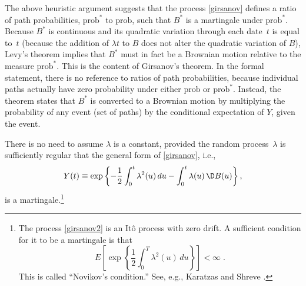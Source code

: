 The above heuristic argument suggests that the process \eqref{girsanov}
defines a ratio of path probabilities, $\text{prob}^*$ to $\text{prob}$, such that $B^*$ is a martingale
under $\text{prob}^*$.  
Because $B^*$ is continuous and its quadratic
variation through each date~$t$ is equal to~$t$ (because the addition
of $\lambda t$ to $B$ does not alter the quadratic variation of $B$),
Levy's theorem implies that $B^*$ 
must in fact be a Brownian motion relative to the measure $\text{prob}^*$.
This is the content of
Girsanov's theorem.  In the formal statement, there is no reference
to ratios of path probabilities, because individual paths actually
have zero probability under either $\text{prob}$ or $\text{prob}^*$.  Instead, the theorem states
that $B^*$ is converted to a Brownian motion by multiplying the probability
of any event (set of paths) by the conditional expectation of $Y$, given the event.

There is no need to assume $\lambda$ is a constant, provided 
the random process~$\lambda$ is 
sufficiently regular that the general form of \eqref{girsanov},
i.e.,
\begin{equation}\label{girsanov2}
Y(t) \equiv \exp \left\{ -\frac{ 1}{2}\int_0^t \lambda^2(u)\,du - \int _0^t
\lambda(u)\,\D B(u) \right\}, 
\end{equation} 
is a martingale.\footnote{The process \eqref{girsanov2} is an It\^o process with zero drift.  A sufficient condition for it to  be a
martingale is that 
$$E \left[ \exp \left\{ \frac{ 1}{2}\int _0^T \lambda^2(u)\,du \right\} \right]
< \infty\; .$$
This is called ``Novikov's condition.''  See, e.g., Karatzas
and Shreve \cite{KS}.}


